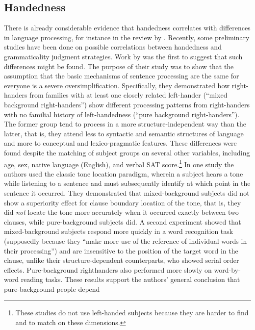 \subsection{Handedness}\label{sec:4.3.2}

There is already considerable evidence that handedness correlates with differences in language processing, for instance in the review by \citet{HardyckEtAl1979}. Recently, some preliminary studies have been done on possible correlations between handedness and grammaticality judgment strategies. Work by \citet{BeverEtAl1987} was the first to suggest that such differences might be found. The purpose of their study was to show that the assumption that the basic mechanisms of sentence processing are the same for everyone is a severe oversimplification. Specifically, they demonstrated how right-handers from families with at least one closely related left-hander (``mixed background right-handers'') show different processing patterns from right-handers with no familial history of left-handedness (``pure background right-handers''). The former group tend to process in a more structure-independent way than the latter, that is, they attend less to syntactic and semantic structures of language and more to conceptual and lexico-pragmatic features. These differences were found despite the matching of subject groups on several other variables, including age, sex, native language (English), and verbal SAT score.\footnote{These studies do not use left-handed subjects because they are harder to find and to match on these dimensions.}
 In one study the authors used the classic tone location paradigm, wherein a subject hears a tone while listening to a sentence and must subsequently identify at which point in the sentence it occurred. They demonstrated that mixed-background subjects did not show a superiority effect for clause boundary location of the tone, that is, they did \textit{not} locate the tone more accurately when it occurred exactly between two clauses, while pure-background subjects did. A second experiment showed that mixed-background subjects respond more quickly in a word recognition task (supposedly because they ``make more use of the reference of individual words in their processing'') and are insensitive to the position of the target word in the clause, unlike their structure-dependent counterparts, who showed serial order effects. Pure-background righthanders also performed more slowly on word-by-word reading tasks. These results support the authors' general conclusion that pure-background people depend
